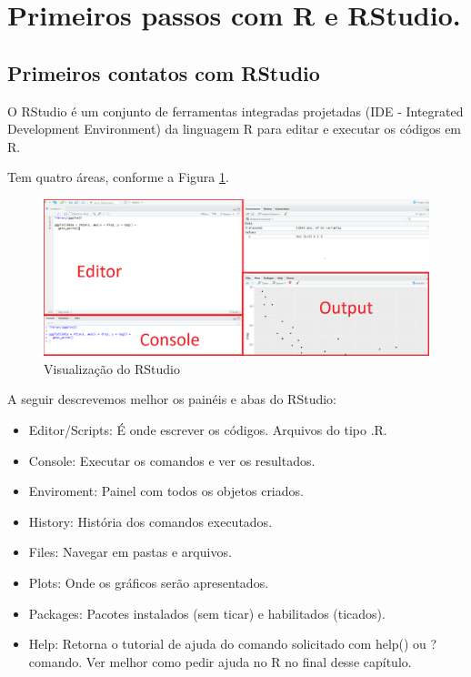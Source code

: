 \documentclass[
]{book}
\begin{document}
\hypertarget{primeiros-passos-com-r-e-rstudio.}{%
\section{Primeiros passos com R e RStudio.}\label{primeiros-passos-com-r-e-rstudio.}}

\hypertarget{primeiros-contatos-com-rstudio}{%
\subsection{Primeiros contatos com RStudio}\label{primeiros-contatos-com-rstudio}}

O RStudio é um conjunto de ferramentas integradas projetadas (IDE - Integrated Development Environment) da linguagem R para editar e executar os códigos em R.

Tem quatro áreas, conforme a Figura \ref{fig:telarstudio1}.

\begin{figure}
\includegraphics[width=1\linewidth]{figures/rstudio1} \caption{\label{fig:rstudio1} Visualização do RStudio}\label{fig:telarstudio1}
\end{figure}

A seguir descrevemos melhor os painéis e abas do RStudio:

\begin{itemize}
\item
  Editor/Scripts: É onde escrever os códigos. Arquivos do tipo .R.
\item
  Console: Executar os comandos e ver os resultados.
\item
  Enviroment: Painel com todos os objetos criados.
\item
  History: História dos comandos executados.
\item
  Files: Navegar em pastas e arquivos.
\item
  Plots: Onde os gráficos serão apresentados.
\item
  Packages: Pacotes instalados (sem ticar) e habilitados (ticados).
\item
  Help: Retorna o tutorial de ajuda do comando solicitado com help() ou ?comando. Ver melhor como pedir ajuda no R no final desse capítulo.
\end{itemize}
\end{document}

